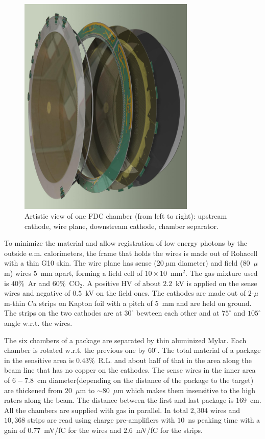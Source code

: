 \begin{figure}[tbp]
\begin{center}
\includegraphics[width=0.75\textwidth]{figures/FDC_OneCell.jpg}  
\caption{\label{FDC_OneCell}
Artistic view of one FDC chamber (from left to right): upstream cathode, wire plane, downstream cathode, chamber separator.
}
\end{center}
\end{figure}
To minimize the material and allow registration of low energy photons by the outside e.m. calorimeters,
the frame that holds the wires is made out of Rohacell with a thin G10 skin.
The wire plane has sense ($20~\mu$m diameter) and field ($80$~$\mu$m) wires $5$~mm apart, forming a field cell of $10\times 10$~mm$^2$. 
The gas mixture used is $40\%$~Ar and $60\%$~CO$_2$.
A positive HV of about $2.2$~kV is applied on the sense wires and negative of $0.5$~kV on the field ones. 
The cathodes are made out of $2$-$\mu$m-thin $Cu$ strips on Kapton foil with a pitch of $5$~mm and are held on ground. The strips on the two cathodes are at $30^\circ $ bewteen each other and at $75^\circ $ and $105^\circ $ angle w.r.t. the wires.

The six chambers of a package are separated by thin aluminized Mylar.
Each chamber is rotated w.r.t. the previous one by $60^\circ $.
The total material of a package in the sensitive area is $0.43\%$~R.L. and about half of that in the area along the beam line that has no copper on the cathodes.
The sense wires in the inner area of $6-7.8$~cm diameter(depending on the distance of the package to the target) are thickened from $20$~$\mu$m to $\sim 80$~$\mu$m which makes them insensitive to the high raters along the beam.
The distance between the first and last package is $169$~cm. 
All the chambers are supplied with gas in parallel. 
In total $2,304$ wires and $10,368$ strips are read using charge pre-amplifiers with $10$~ns peaking time with a gain of $0.77$~mV/fC for the wires and $2.6$~mV/fC for the strips.

